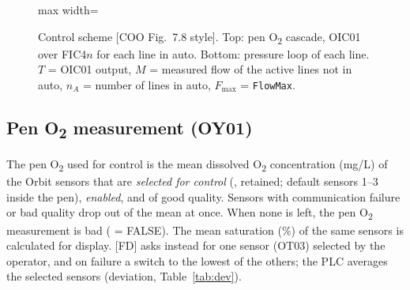 \documentclass[11pt,a4paper]{article}
\newcommand{\Otwo}{O\textsubscript{2}}
\begin{document}
\begin{figure}[htbp]
\begin{adjustbox}{max width=\linewidth}
\end{adjustbox}
\caption{Control scheme [COO Fig.~7.8 style]. Top: pen \Otwo{} cascade, OIC01 over FIC4$n$ for each
line in auto. Bottom: pressure loop of each line. $T$ = OIC01 output, $M$ = measured flow of the
active lines not in auto, $n_A$ = number of lines in auto, $F_\text{max}$ = \texttt{FlowMax}.}
\label{fig:cascade}
\end{figure}

\subsection{Pen \texorpdfstring{\Otwo}{O2} measurement (OY01)}
The pen \Otwo{} used for control is the mean dissolved \Otwo{} concentration (mg/L) of the Orbit
sensors that are \emph{selected for control} (,
retained; default sensors 1--3 inside the pen), \emph{enabled}, and of good quality. Sensors with
communication failure or bad quality drop out of the mean at once. When none is left, the pen
\Otwo{} measurement is bad ( = FALSE). The mean saturation (\%) of the
same sensors is calculated for display. [FD] asks instead for one sensor (OT03) selected by the
operator, and on failure a switch to the lowest of the others; the PLC averages the selected
sensors (deviation, Table~\ref{tab:dev}).
\end{document}
